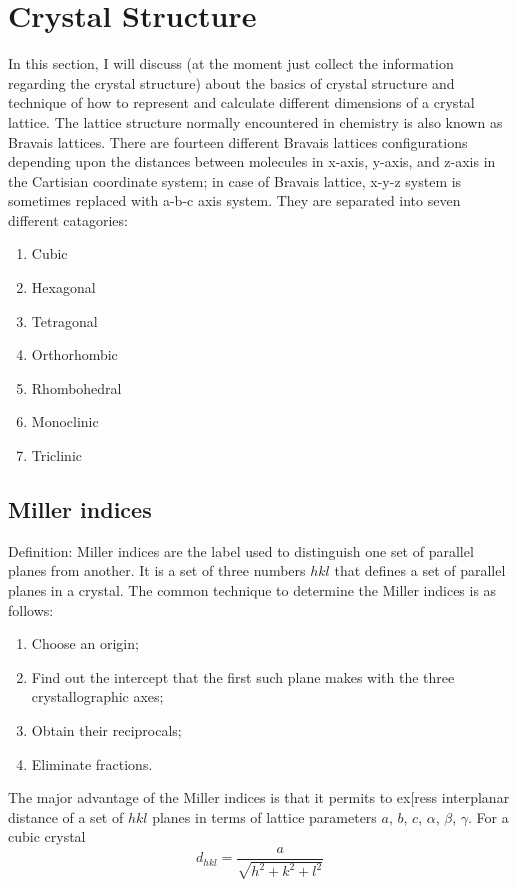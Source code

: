 \documentclass[12pt]{book}
\begin{document}
\section{Crystal Structure}

In this section, I will discuss (at the moment just collect the information
regarding the crystal structure) about the basics of crystal structure
and technique of how to represent and calculate different dimensions
of a crystal lattice. The lattice structure normally encountered in
chemistry is also known as Bravais lattices. There are fourteen different
Bravais lattices configurations depending upon the distances between
molecules in x-axis, y-axis, and z-axis in the Cartisian coordinate
system; in case of Bravais lattice, x-y-z system is sometimes replaced
with a-b-c axis system. They are separated into seven different catagories:
\begin{enumerate}
	\item Cubic
	\item Hexagonal
	\item Tetragonal
	\item Orthorhombic
	\item Rhombohedral
	\item Monoclinic
	\item Triclinic
\end{enumerate}

\subsection{Miller indices}

Definition: Miller indices are the label used to distinguish one set
of parallel planes from another. It is a set of three numbers $hkl$
that defines a set of parallel planes in a crystal. The common technique
to determine the Miller indices is as follows:
\begin{enumerate}
	\item Choose an origin;
	\item Find out the intercept that the first such plane makes with the three
	crystallographic axes;
	\item Obtain their reciprocals;
	\item Eliminate fractions.
\end{enumerate}
The major advantage of the Miller indices is that it permits to ex{[}ress
interplanar distance of a set of $hkl$ planes in terms of lattice
parameters $a$, $b$, $c$, $\alpha$, $\beta$, $\gamma$. For a
cubic crystal 
\[
d_{hkl}=\frac{a}{\sqrt{h^{2}+k^{2}+l^{2}}}
\]
\end{document}
